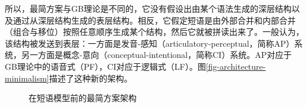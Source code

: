 所以，最简方案与GB理论是不同的，它没有假设出由某个\xbarc 语法生成的深层结构以及通过\moveac 从深层结构生成的表层结构。相反，它假定短语是由外部合并和内部合并（组合与移位）按照任意顺序生成某个结构，然后它就被拼读出来了。一般认为，该结构被发送到表层：一方面是发音-感知（articulatory-perceptual，简称AP）系统，另一方面是概念-意向（conceptual-intentional，简称CI）系统。AP对应于GB理论中的语音式（PF），CI对应于逻辑式（LF）。图\vref{fig-architecture-minimalism}描述了这种新的架构。
\begin{figure}
\caption{\label{fig-architecture-minimalism}在短语模型前的最简方案架构}
\end{figure}%
